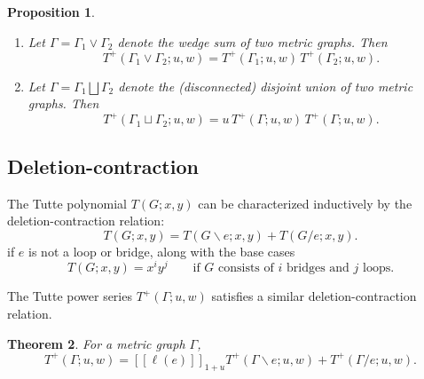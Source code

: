 \documentclass{amsart}
\newtheorem{thm}{Theorem}
\newtheorem{prop}[thm]{Proposition}
\theoremstyle{definition}
\newcommand{\fanalog}[2]{[\![#2]\!]_{#1}}
\begin{document}
\begin{prop}
\hfill
\begin{enumerate}
\item 
Let $\Gamma = \Gamma_1 \vee \Gamma_2$ denote the wedge sum of two metric graphs. Then
\[
	T^+(\Gamma_1 \vee \Gamma_2; u,w) = T^+(\Gamma_1; u,w) \, T^+(\Gamma_2; u, w).
\]

\item 
Let $\Gamma = \Gamma_1 \bigsqcup \Gamma_2$ denote the (disconnected) disjoint union of two metric graphs. Then
\[
	T^+(\Gamma_1 \sqcup \Gamma_2; u,w) = u\, T^+(\Gamma; u,w) \, T^+(\Gamma; u, w).
\]

\end{enumerate}
\end{prop}


\subsection{Deletion-contraction}

The Tutte polynomial $T(G; x,y)$ can be characterized inductively by the deletion-contraction relation:
\begin{equation*}
	T(G;x,y) = T(G \backslash e; x,y) + T(G / e; x,y).
\end{equation*}
if $e$ is not a loop or bridge,
along with the base cases 
\begin{equation*}
	T(G; x,y) = x^i y^j \qquad\text{if $G$ consists of $i$ bridges and $j$ loops.}
\end{equation*}

The Tutte power series $T^+(\Gamma; u,w)$ satisfies a similar deletion-contraction relation.

\begin{thm}\label{thm:deletion-contraction}
For a metric graph $\Gamma$,
\begin{equation}
	T^+(\Gamma; u,w) 
	= \fanalog{1 + u}{\ell(e)} T^+(\Gamma \backslash e; u,w) + T^+(\Gamma / e; u,w) .
\end{equation}
\end{thm}
\end{document}
